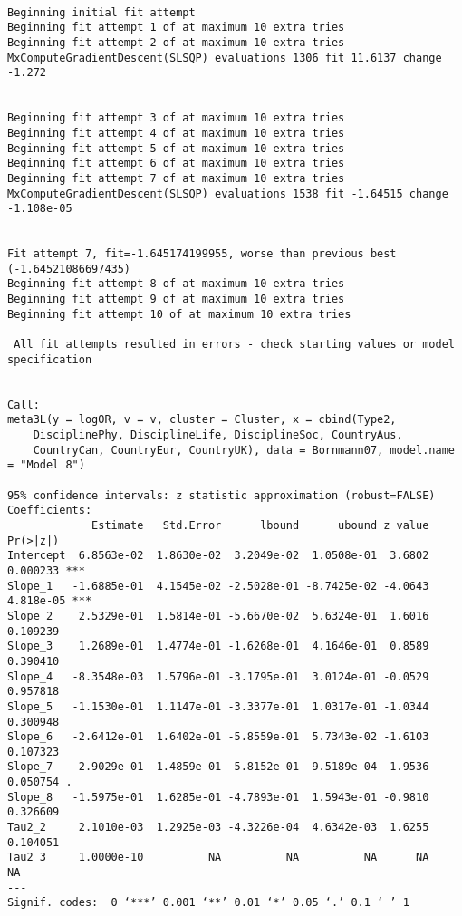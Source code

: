 \documentclass[11pt]{article}
\begin{document}
\begin{verbatim}

Beginning initial fit attempt
Beginning fit attempt 1 of at maximum 10 extra tries
Beginning fit attempt 2 of at maximum 10 extra tries
MxComputeGradientDescent(SLSQP) evaluations 1306 fit 11.6137 change -1.272
                                                                          

Beginning fit attempt 3 of at maximum 10 extra tries
Beginning fit attempt 4 of at maximum 10 extra tries
Beginning fit attempt 5 of at maximum 10 extra tries
Beginning fit attempt 6 of at maximum 10 extra tries
Beginning fit attempt 7 of at maximum 10 extra tries
MxComputeGradientDescent(SLSQP) evaluations 1538 fit -1.64515 change -1.108e-05
                                                                               

Fit attempt 7, fit=-1.645174199955, worse than previous best (-1.64521086697435)
Beginning fit attempt 8 of at maximum 10 extra tries                            
Beginning fit attempt 9 of at maximum 10 extra tries
Beginning fit attempt 10 of at maximum 10 extra tries
                                                     
 All fit attempts resulted in errors - check starting values or model specification


Call:
meta3L(y = logOR, v = v, cluster = Cluster, x = cbind(Type2, 
    DisciplinePhy, DisciplineLife, DisciplineSoc, CountryAus, 
    CountryCan, CountryEur, CountryUK), data = Bornmann07, model.name = "Model 8")

95% confidence intervals: z statistic approximation (robust=FALSE)
Coefficients:
             Estimate   Std.Error      lbound      ubound z value  Pr(>|z|)    
Intercept  6.8563e-02  1.8630e-02  3.2049e-02  1.0508e-01  3.6802  0.000233 ***
Slope_1   -1.6885e-01  4.1545e-02 -2.5028e-01 -8.7425e-02 -4.0643 4.818e-05 ***
Slope_2    2.5329e-01  1.5814e-01 -5.6670e-02  5.6324e-01  1.6016  0.109239    
Slope_3    1.2689e-01  1.4774e-01 -1.6268e-01  4.1646e-01  0.8589  0.390410    
Slope_4   -8.3548e-03  1.5796e-01 -3.1795e-01  3.0124e-01 -0.0529  0.957818    
Slope_5   -1.1530e-01  1.1147e-01 -3.3377e-01  1.0317e-01 -1.0344  0.300948    
Slope_6   -2.6412e-01  1.6402e-01 -5.8559e-01  5.7343e-02 -1.6103  0.107323    
Slope_7   -2.9029e-01  1.4859e-01 -5.8152e-01  9.5189e-04 -1.9536  0.050754 .  
Slope_8   -1.5975e-01  1.6285e-01 -4.7893e-01  1.5943e-01 -0.9810  0.326609    
Tau2_2     2.1010e-03  1.2925e-03 -4.3226e-04  4.6342e-03  1.6255  0.104051    
Tau2_3     1.0000e-10          NA          NA          NA      NA        NA    
---
Signif. codes:  0 ‘***’ 0.001 ‘**’ 0.01 ‘*’ 0.05 ‘.’ 0.1 ‘ ’ 1


\end{verbatim}
\end{document}
